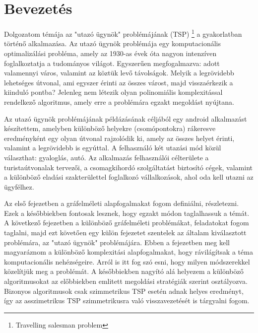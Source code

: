 \chapter{Bevezetés}\label{ch:ALAP}

Dolgozatom témája az "utazó ügynök" problémájának (TSP)%
\footnote{ %
	Travelling salesman problem
}  %
 a gyakorlatban történő alkalmazása. Az utazó ügynök problémája egy komputacionális optimalizálási probléma, amely az 1930-as évek óta nagyon intenzíven foglalkoztatja a tudományos világot. Egyszerűen megfogalmazva: adott valamennyi város, valamint az köztük levő távolságok. Melyik a legrövidebb lehetséges útvonal, ami egyszer érinti az összes várost, majd visszaérkezik a kiinduló pontba? Jelenleg nem létezik olyan polinomiális komplexitással rendelkező algoritmus, amely erre a problémára egzakt megoldást nyújtana.

Az utazó ügynök problémájának példázásának céljából egy android alkalmazást készítettem, amelyben különböző helyekre (csomópontokra) rákeresve eredményként egy olyan útvonal rajzolódik ki, amely az összes helyet érinti, valamint a legrövidebb is egyúttal. A felhasználó két utazási mód közül választhat: gyaloglás, autó. Az alkalmazás felhasználói célterülete a turistaútvonalak tervezői, a csomagkihordó szolgáltatást biztosító cégek, valamint a különböző eladási szakterülettel foglalkozó vállalkozások, ahol oda kell utazni az ügyfélhez.

Az első fejezetben a gráfelméleti alapfogalmakat fogom definiálni, részletezni. Ezek a későbbiekben fontosak lesznek, hogy egzakt módon taglalhassuk a témát. A következő fejezetben a különböző gráfelméleti problémákat, feladatokat fogom taglalni, majd ezt követően egy külön fejezetet szentelek az általam kiválasztott problémára, az "utazó ügynök" problémájára. Ebben a fejezetben meg kell magyaráznom a különböző komplexitási alapfogalmakat, hogy rávilágítsak a téma komputacionális nehézségeire. Arról is itt fog szó esni, hogy milyen módszerekkel közelítjük meg a problémát. A későbbiekben nagyító alá helyezem a különböző algoritmusokat az előbbiekben emlitett megoldási stratégiák szerint osztályozva. Bizonyos algoritmusok csak szimmetrikus TSP esetén adnak helyes eredményt, így az asszimetrikus TSP szimmetrikusra való visszavezetését is tárgyalni fogom.

